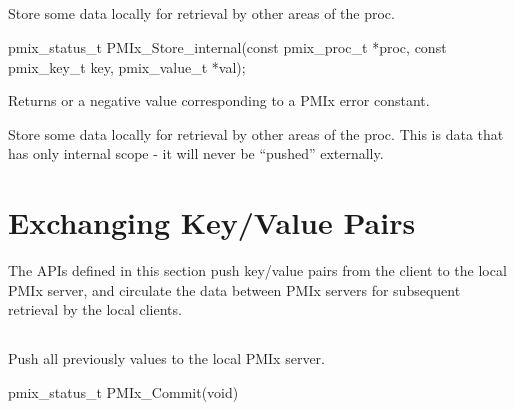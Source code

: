 \subsection{}

\summary

Store some data locally for retrieval by other areas of the proc.

\format

\cspecificstart
\begin{codepar}
pmix_status_t
PMIx_Store_internal(const pmix_proc_t *proc,
                    const pmix_key_t key,
                    pmix_value_t *val);
\end{codepar}
\cspecificend

\begin{arglist}
\end{arglist}

Returns  or a negative value corresponding to a PMIx error constant.

\descr

Store some data locally for retrieval by other areas of the proc.
This is data that has only internal scope - it will never be ``pushed'' externally.

\section{Exchanging Key/Value Pairs}
\label{chap:api_kv_mgmt:exchange}

The APIs defined in this section push key/value pairs from the client to the local \ac{PMIx} server, and circulate the data between \ac{PMIx} servers for subsequent retrieval by the local clients.

\subsection{}

\summary

Push all previously  values to the local PMIx server.

\format

\cspecificstart
\begin{codepar}
pmix_status_t PMIx_Commit(void)
\end{codepar}
\cspecificend

